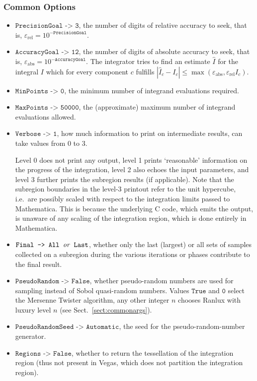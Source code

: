 \documentclass[12pt]{article}
\newcommand\ie{i.e.\ }
\newcommand\epsabs{\varepsilon_{\text{abs}}}
\newcommand\epsrel{\varepsilon_{\text{rel}}}
\newcommand\Code[1]{\ensuremath{\texttt{#1}}}
\newcommand\Var[1]{\ensuremath{\mathit{#1}}}
\newcommand\Option[2]{\item\Code{#1 -> #2},}
\begin{document}
\subsubsection{Common Options}

\begin{itemize}
\Option{PrecisionGoal}{3}
the number of digits of relative accuracy to seek, that is, $\epsrel =
10^{-\Code{PrecisionGoal}}$.

\Option{AccuracyGoal}{12}
the number of digits of absolute accuracy to seek, that is, $\epsabs =
10^{-\Code{AccuracyGoal}}$.  The integrator tries to find an estimate
$\hat I$ for the integral $I$ which for every component $c$ fulfills
$|\hat I_c - I_c|\leqslant \max(\epsabs, \epsrel I_c)$.

\Option{MinPoints}{0}
the minimum number of integrand evaluations required.

\Option{MaxPoints}{50000}
the (approximate) maximum number of integrand evaluations allowed.

\Option{Verbose}{1}
how much information to print on intermediate results, can take values
from 0 to 3.

Level 0 does not print any output, level 1 prints `reasonable'
information on the progress of the integration, level 2 also echoes the
input parameters, and level 3 further prints the subregion results (if
applicable).  Note that the subregion boundaries in the level-3 printout
refer to the unit hypercube, \ie are possibly scaled with respect to the
integration limits passed to Mathematica.  This is because the
underlying C code, which emits the output, is unaware of any scaling of
the integration region, which is done entirely in Mathematica.

\Option{Final}{All \Var{or} Last}
whether only the last (largest) or all sets of samples collected on a
subregion during the various iterations or phases contribute to the
final result.

\Option{PseudoRandom}{False}
whether pseudo-random numbers are used for sampling instead of Sobol
quasi-random numbers.  Values \Code{True} and \Code{0} select the
Mersenne Twister algorithm, any other integer $n$ chooses Ranlux with
luxury level $n$ (see Sect.\ \ref{sect:commonargs}).

\Option{PseudoRandomSeed}{Automatic}
the seed for the pseudo-random-number generator.

\Option{Regions}{False}
whether to return the tessellation of the integration region (thus not
present in Vegas, which does not partition the integration region).


\end{itemize}
\end{document}

